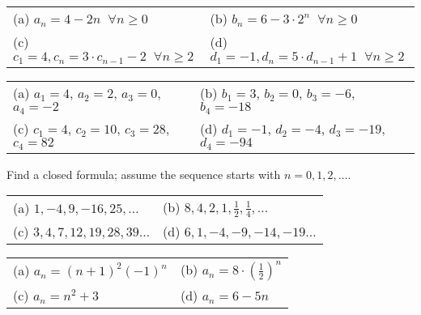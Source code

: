 \begin{questions}
\begin{tabular}{ll}
    (a) $a_n = 4-2n\;\;\forall n \geq 0$ \hspace{0.35in} 
        & (b) $b_n = 6- 3\cdot 2^n \;\;\forall n \geq 0$ \\
    (c) $c_1 = 4,  c_n = 3\cdot c_{n-1} - 2 \;\; \forall n \geq 2$ \hspace{0.3in}
        & (d) $d_1 = -1, d_n = 5\cdot d_{n-1} + 1\;\; \forall n \geq 2$ \\
\end{tabular}
    \ifprintanswers
        \vspace{-10pt}
   \fi
\begin{solution}

    \begin{tabular}{ll}
        (a) $a_1 = 4$, $a_2 = 2$, $a_3 = 0$, $a_4 = -2$ \hspace{0.2in}
            & (b) $b_1 = 3$, $b_2 = 0$, $b_3 = -6$, $b_4 = -18$ \\
        (c) $c_1 = 4$, $c_2 = 10$, $c_3 = 28$, $c_4 = 82$
            & (d) $d_1 = -1$, $d_2 = -4$, $d_3 = -19$, $d_4 = -94$ \\
    \end{tabular}
\end{solution}



 Find a closed formula; assume the sequence starts with $n=0, 1, 2, \ldots$.

\begin{tabular}{ll}
    (a) $1, -4, 9, -16, 25, \ldots$ 
        & (b) $8, 4, 2, 1, \frac{1}{2}, \frac{1}{4},  \ldots$ \\
        (c) $3, 4, 7, 12, 19, 28, 39 \ldots$ 
    & (d) $6, 1, -4, -9, -14, -19 \ldots$ \\
\end{tabular}
    \ifprintanswers
        \vspace{-10pt}
   \fi
\begin{solution}
    
    \begin{tabular}{ll}
        (a) $a_n = (n+1)^2 (-1)^n$ \hspace{0.6in}
            & (b) $a_n = 8\cdot (\frac{1}{2})^n$ \hspace{0.6in} \\
        (c) $a_n = n^2 + 3$
            & (d) $a_n = 6 - 5n$
    \end{tabular}
\end{solution}




\end{questions}
